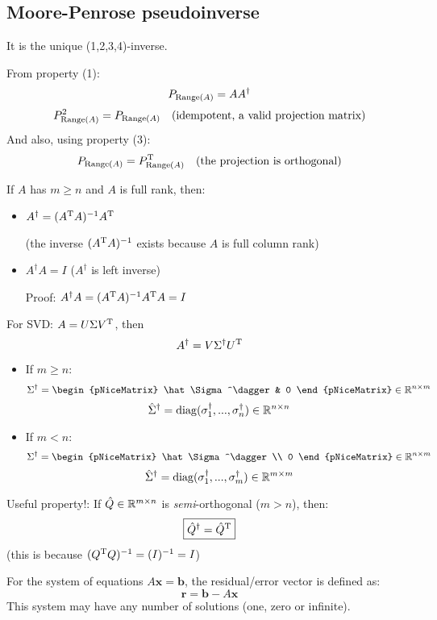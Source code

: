 \documentclass[
  12pt,
  paper=a4,
]{scrartcl} %
\begin{document}
\subsection*{Moore-Penrose pseudoinverse}

It is the unique (1,2,3,4)-inverse.

From property (1):
\[
    P_{\operatorname{Range}(A)} = AA^\dagger
\]
\[
    P_{\operatorname{Range}(A)}^2 = P_{\operatorname{Range}(A)} \quad \text{(idempotent, a valid projection matrix)}
\]
And also, using property (3):
\[
    P_{\operatorname{Range}(A)} = P_{\operatorname{Range}(A)}^{\mathrm{T}} \quad \text{(the projection is orthogonal)}
\]

If $A$ has $m\ge n$ and $A$ is full rank, then:
\begin{itemize}
    \item $A^\dagger = (A^{\mathrm{T}} A)^{-1}A^{\mathrm{T}}$

    (the inverse $(A^{\mathrm{T}} A)^{-1}$ exists because $A$ is full column rank)
    \item $A^\dagger A = I$ ($A^\dagger$ is left inverse)
    
    Proof: $A^\dagger A = (A^{\mathrm{T}} A)^{-1}A^{\mathrm{T}} A = I$
\end{itemize}

For SVD: $A=U\Sigma V^{\mathrm{T}}$, then
\[
    A^\dagger = V \Sigma^\dagger U^{\mathrm{T}}
\]

\begin{itemize}
    \item
    If $m\ge n$:
    \[\Sigma^\dagger = 
    \begin{pNiceMatrix}
    \hat\Sigma^\dagger & 0 
    \end{pNiceMatrix}
    \in \RR^{n\times m}
    \]
    \[\hat\Sigma^\dagger = 
    \operatorname{diag}(\sigma_1^\dagger, ..., \sigma_n^\dagger)
    \in \mathbb R^{n\times n}
    \]
    \item
    If $m< n$:
    \[\Sigma^\dagger = 
    \begin{pNiceMatrix}
    \hat\Sigma^\dagger \\ 0 
    \end{pNiceMatrix}
    \in \RR^{n\times m}
    \]
    \[\hat\Sigma^\dagger = 
    \operatorname{diag}(\sigma_1^\dagger, ..., \sigma_m^\dagger)
    \in \mathbb R^{m\times m}
    \]
\end{itemize}

Useful property!: If $\hat Q\in\mathbb R^{m\times n}$ is \emph{semi}-orthogonal ($m>n$), then:
\[
    \boxed{\hat Q^\dagger = \hat Q^{\mathrm{T}}}
\]
(this is because $(Q^{\mathrm{T}} Q)^{-1} = (I)^{-1}= I$)

For the system of equations $A\bm x = \bm b$, the residual/error vector is defined as:
\[\bm r = \bm b - A\bm x\]
This system may have any number of solutions (one, zero or infinite).
\end{document}
